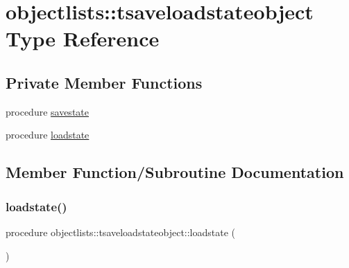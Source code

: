 \hypertarget{structobjectlists_1_1tsaveloadstateobject}{}\section{objectlists\+:\+:tsaveloadstateobject Type Reference}
\label{structobjectlists_1_1tsaveloadstateobject}
\subsection*{Private Member Functions}
\begin{DoxyCompactItemize}
\item 
procedure \mbox{\hyperlink{structobjectlists_1_1tsaveloadstateobject_a5f976b61dbd906312862952b41c4c879}{savestate}}
\item 
procedure \mbox{\hyperlink{structobjectlists_1_1tsaveloadstateobject_a1d5dbf1b4e7e99ad24813b688ee680a1}{loadstate}}
\end{DoxyCompactItemize}


\subsection{Member Function/\+Subroutine Documentation}
\mbox{\label{structobjectlists_1_1tsaveloadstateobject_a1d5dbf1b4e7e99ad24813b688ee680a1}} 
\subsubsection{\texorpdfstring{loadstate()}{loadstate()}}
{\footnotesize\ttfamily procedure objectlists\+::tsaveloadstateobject\+::loadstate (\begin{DoxyParamCaption}{ }\end{DoxyParamCaption})\hspace{0.3cm}{\ttfamily [private]}}

\mbox{\label{structobjectlists_1_1tsaveloadstateobject_a5f976b61dbd906312862952b41c4c879}} 
